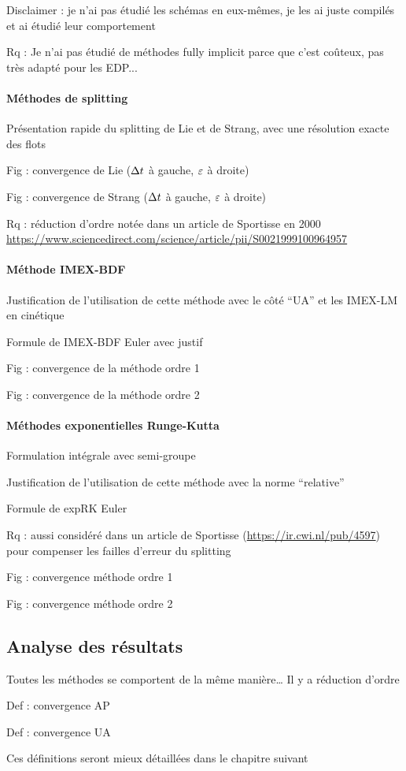 Disclaimer : je n’ai pas étudié les schémas en eux-mêmes, je les ai juste compilés et ai étudié leur comportement

Rq : Je n’ai pas étudié de méthodes fully implicit parce que c’est coûteux, pas très adapté pour les EDP...

\paragraph{Méthodes de splitting}

Présentation rapide du splitting de Lie et de Strang, avec une résolution exacte des flots

Fig : convergence de Lie ($\Delta t$ à gauche, $\varepsilon$ à droite)

Fig : convergence de Strang ($\Delta t$ à gauche, $\varepsilon$ à droite)

Rq : réduction d’ordre notée dans un article de Sportisse en 2000 \url{https://www.sciencedirect.com/science/article/pii/S0021999100964957}


\paragraph{Méthode IMEX-BDF}

Justification de l’utilisation de cette méthode avec le côté “UA” et les IMEX-LM en cinétique

Formule de IMEX-BDF Euler avec justif

Fig : convergence de la méthode ordre 1

Fig : convergence de la méthode ordre 2


\paragraph{Méthodes exponentielles Runge-Kutta}

Formulation intégrale avec semi-groupe

Justification de l’utilisation de cette méthode avec la norme “relative”

Formule de expRK Euler

Rq : aussi considéré dans un article de Sportisse (\url{https://ir.cwi.nl/pub/4597}) pour compenser les failles d’erreur du splitting

Fig : convergence méthode ordre 1

Fig : convergence méthode ordre 2


\subsection*{Analyse des résultats}

Toutes les méthodes se comportent de la même manière… Il y a réduction d’ordre

Def : convergence AP

Def : convergence UA

Ces définitions seront mieux détaillées dans le chapitre suivant
